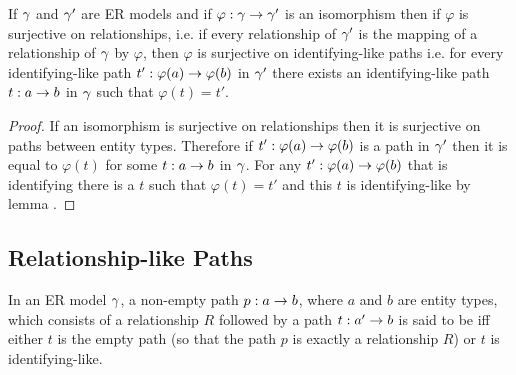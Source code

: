 \begin{lemma}
If $\gamma$ and $\gamma'$ are ER models and if $\varphi:\gamma \rightarrow \gamma'$ is an isomorphism then if $\varphi$ is 
surjective on relationships, i.e. if every relationship of $\gamma'$ is the mapping of a relationship of $\gamma$ by  $\varphi$,
then $\varphi$ is surjective on identifying-like paths i.e. for every identifying-like path $t': \varphi(a) \rightarrow \varphi(b)$
in $\gamma'$ there exists an identifying-like path $t: a \rightarrow b$ in $\gamma$ such that $\varphi(t)=t'$. 
\end{lemma}
\begin{proof}
If an isomorphism is surjective on relationships then it is surjective on paths between entity types.
Therefore if $t':\varphi(a) \rightarrow \varphi(b)$ is a path in $\gamma'$ then it is equal to $\varphi(t)$ for some
$t: a \rightarrow b$ in $\gamma$. For any $t':\varphi(a) \rightarrow \varphi(b)$ that is identifying there is a $t$ such that 
$\varphi(t)=t'$ and this $t$ is identifying-like by lemma .  
\end{proof}
\subsection{Relationship-like Paths}
\begin{definition}
In an ER model $\gamma$, a non-empty path $p: a \rightarrow b$, where $a$ and $b$ are entity types, which consists
of a relationship $R$ followed by a  path $t :a' \rightarrow b$ is said to be  iff
either  $t$ is the empty path (so that the path $p$ is exactly a relationship $R$) or $t$
is identifying-like.
\end{definition}


